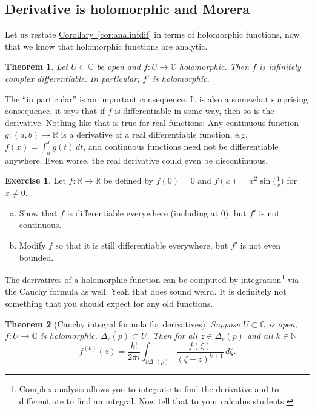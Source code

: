 \documentclass[12pt,openany]{book}
\newcommand{\C}{{\mathbb{C}}}
\newcommand{\R}{{\mathbb{R}}}
\newcommand{\N}{{\mathbb{N}}}
\theoremstyle{plain}
\newtheorem{thm}{Theorem}[section]
\theoremstyle{remark}
\theoremstyle{definition}
\newenvironment{exbox}{%
    \def\FrameCommand{\vrule width 1pt \relax\hspace {10pt}}%
    \MakeFramed {\advance \hsize -\width \FrameRestore }%
}{%
    \endMakeFramed
}
\newenvironment{exparts}{%
    \leavevmode\begin{enumerate}[a),noitemsep,topsep=0pt,parsep=0pt,partopsep=0pt]
}{%
    \end{enumerate}
}
\theoremstyle{exercise}
\newtheorem{exercise}{Exercise}[section]
\theoremstyle{example}
\newcommand{\corref}[1]{\hyperref[#1]{Corollary~\ref*{#1}}}
\begin{document}
\subsection{Derivative is holomorphic and Morera}

Let us restate \corref{cor:analinfdif} in terms of
holomorphic functions, now that we know that holomorphic functions are
analytic.

\begin{thm} \label{thm:holfuncinfder}
Let $U \subset \C$ be open and $f \colon U \to \C$ holomorphic.  Then
$f$ is infinitely complex differentiable.  In particular, $f'$ is
holomorphic.
\end{thm}

The ``in particular'' is an important consequence.  It is also a somewhat
surprising consequence, it says that if $f$ is differentiable in some way,
then so is the derivative.  Nothing like that is true for real functions:
Any continuous function $g \colon (a,b) \to \R$ is a derivative
of a real differentiable function, e.g.\ $f(x) = \int_a^x g(t)\,dt$,
and continuous functions need not be differentiable anywhere.
Even worse, the real derivative could even be discontinuous.

\begin{exbox}
\begin{exercise}
Let $f \colon \R \to \R$ be defined by $f(0) = 0$ and $f(x) = x^2
\sin\bigl( \frac{1}{x} \bigr)$ for $x \not= 0$.
\begin{exparts}
\item
Show that $f$ is
differentiable everywhere (including at $0$), but $f'$ is not continuous.
\item
Modify $f$ so that it is still differentiable everywhere, but $f'$ is not
even bounded.
\end{exparts}
\end{exercise}
\end{exbox}

The derivatives of a holomorphic function can be computed by
integration\footnote{Complex analysis allows you to integrate to find the
derivative and to differentiate to find an integral.  Now tell that to your
calculus students.} via the Cauchy formula as well.  Yeah that does sound
weird.  It is definitely not something that you should expect for any old
functions.

\begin{thm}[Cauchy integral formula for derivatives]
Suppose $U \subset \C$ is open, $f \colon U \to \C$ is holomorphic,
$\overline{\Delta_r(p)} \subset U$.
Then for all $z \in \Delta_r(p)$ and all $k \in \N$
\begin{equation*}
f^{(k)}(z)
=
\frac{k!}{2\pi i}
\int_{\partial \Delta_r(p)}
\frac{f(\zeta)}{(\zeta-z)^{k+1}}
\,
d \zeta .
\end{equation*}
\end{thm}
\end{document}
